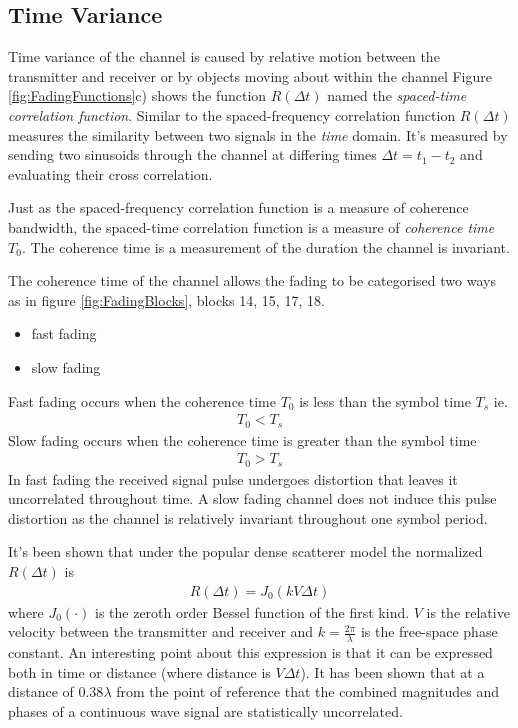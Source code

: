 \subsection{Time Variance}
Time variance of the channel is caused by relative %
motion between the transmitter and receiver or by %
objects moving about within the channel %
Figure \ref{fig:FadingFunctions}c) shows the function %
$R(\Delta t)$ named the \emph{spaced-time correlation %
function}. Similar to the spaced-frequency correlation %
function $R(\Delta t)$ measures the similarity between %
two signals in the \emph{time} domain. It's measured %
by sending two sinusoids through the channel at differing %
times $\Delta t = t_{1} - t_{2}$ and evaluating their %
cross correlation. 

Just as the spaced-frequency correlation function is a %
measure of coherence bandwidth, the spaced-time %
correlation function is a measure of \emph{coherence %
time} $T_{0}$. The coherence time is a measurement of %
the duration the channel is invariant. 

The coherence time of the channel allows the fading %
to be categorised two ways as in figure \ref{fig:FadingBlocks}, %
blocks 14, 15, 17, 18.
\begin{itemize}
	\item{fast fading}
	\item{slow fading}
\end{itemize}
Fast fading occurs when the coherence time $T_{0}$ %
is less than the symbol time $T_{s}$ ie.
\begin{align}
	T_{0} < T_{s}
\end{align}
Slow fading occurs when the coherence time is %
greater than the symbol time
\begin{align}
	T_{0} > T_{s}
\end{align}
In fast fading the received signal pulse undergoes %
distortion that leaves it uncorrelated throughout time. %
A slow fading channel does not induce this pulse distortion %
as the channel is relatively invariant throughout one symbol %
period.

It's been shown \cite{Clarke68} that under the popular %
dense scatterer model the normalized $R(\Delta t)$ is
\begin{align}
	R(\Delta t) = J_{0}(kV \Delta t)
\end{align}
where $J_{0}(\cdot)$ is the zeroth order Bessel %
function of the first kind. $V$ is the relative velocity %
between the transmitter and receiver and %
$k = \frac{2\pi}{\lambda}$ is the free-space %
phase constant. An interesting point about %
this expression is that it can be expressed both %
in time or distance (where distance is $V\Delta t$). %
It has been shown \cite{Amoroso96} that at a %
distance of $0.38\lambda$ from the point of %
reference that the combined magnitudes and %
phases of a continuous wave signal are %
statistically uncorrelated.

